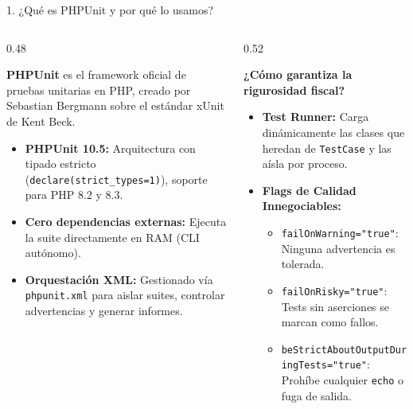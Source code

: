 \documentclass[aspectratio=169,10pt]{beamer}
\begin{document}
\begin{frame}{1. ¿Qué es PHPUnit y por qué lo usamos?}
\begin{columns}
\begin{column}{0.48\textwidth}
    \begin{tcolorbox}[colback=cardbg, colframe=cardbg, title=\color{accentblue}\bfseries El Estándar Global de la Industria]
        \textbf{PHPUnit} es el framework oficial de pruebas unitarias en PHP, creado por Sebastian Bergmann sobre el estándar xUnit de Kent Beck.
        \begin{itemize}
            \item \textbf{PHPUnit 10.5:} Arquitectura con tipado estricto (\texttt{declare(strict\_types=1)}), soporte para PHP 8.2 y 8.3.
            \item \textbf{Cero dependencias externas:} Ejecuta la suite directamente en RAM (CLI autónomo).
            \item \textbf{Orquestación XML:} Gestionado vía \texttt{phpunit.xml} para aislar suites, controlar advertencias y generar informes.
        \end{itemize}
    \end{tcolorbox}
\end{column}
\begin{column}{0.52\textwidth}
    \begin{tcolorbox}[colback=cardbg, colframe=cardbg, title=\color{accentgreen}\bfseries Arquitectura del Runner de Pruebas]
        \textbf{¿Cómo garantiza la rigurosidad fiscal?}
        \begin{itemize}
            \item \textbf{Test Runner:} Carga dinámicamente las clases que heredan de \texttt{TestCase} y las aísla por proceso.
            \item \textbf{Flags de Calidad Innegociables:}
            \begin{itemize}
                \item \texttt{failOnWarning="true"}: Ninguna advertencia es tolerada.
                \item \texttt{failOnRisky="true"}: Tests sin aserciones se marcan como fallos.
                \item \texttt{beStrictAboutOutputDuringTests="true"}: Prohíbe cualquier \texttt{echo} o fuga de salida.
            \end{itemize}
        \end{itemize}
    \end{tcolorbox}
\end{column}
\end{columns}
\end{frame}
\end{document}
